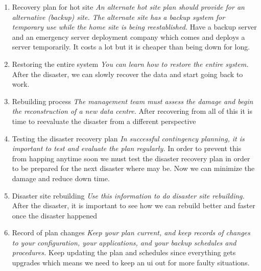 \documentclass[12pt, letterpaper]{article}
\begin{document}
\begin{enumerate}
\item Recovery plan for hot site
\hfill\break
\textit{An alternate hot site plan should provide for an alternative (backup) site. The alternate site has a backup system for temporary use while the home site is being reestablished.}
\hfill\break
Have a backup server and an emergency server deployment company which comes and deploys a server temporarily. It costs a lot but it is cheaper than being down for long. 

\item Restoring the entire system
\hfill\break
\textit{You can learn how to restore the entire system.}
\hfill\break
After the disaster, we can slowly recover the data and start going back to work.

\item Rebuilding process
\hfill\break
\textit{The management team must assess the damage and begin the reconstruction of a new data centre.}
\hfill\break
After recovering from all of this it is time to reevaluate the disaster from a different perspective

\item Testing the disaster recovery plan
\hfill\break
\textit{In successful contingency planning, it is important to test and evaluate the plan regularly.}
\hfill\break
In order to prevent this from happing anytime soon we must test the disaster recovery plan in order to be prepared for the next disaster where may be. Now we can minimize the damage and reduce down time.

\item Disaster site rebuilding
\hfill\break
\textit{Use this information to do disaster site rebuilding.}
\hfill\break
After the disaster, it is important to see how we can rebuild better and faster once the disaster happened 
\item Record of plan changes
\hfill\break
\textit{Keep your plan current, and keep records of changes to your configuration, your applications, and your backup schedules and procedures.}
\hfill\break
Keep updating the plan and schedules since everything gets upgrades which means we need to keep an ui out for more faulty situations.
\newpage
\end{enumerate}
\end{document}

